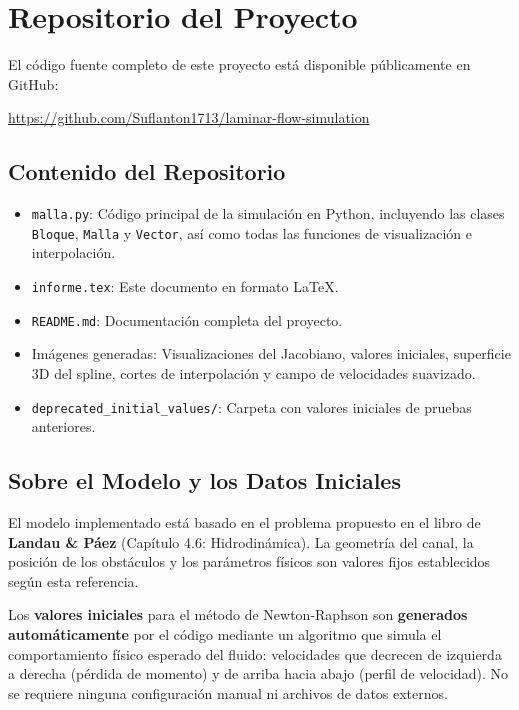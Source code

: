 \documentclass[11pt,letterpaper]{article}
\begin{document}
\section{Repositorio del Proyecto}

El código fuente completo de este proyecto está disponible públicamente en GitHub:

\begin{center}
\url{https://github.com/Suflanton1713/laminar-flow-simulation}
\end{center}

\subsection{Contenido del Repositorio}

\begin{itemize}
    \item \texttt{malla.py}: Código principal de la simulación en Python, incluyendo las clases \texttt{Bloque}, \texttt{Malla} y \texttt{Vector}, así como todas las funciones de visualización e interpolación.
    \item \texttt{informe.tex}: Este documento en formato \LaTeX.
    \item \texttt{README.md}: Documentación completa del proyecto.
    \item Imágenes generadas: Visualizaciones del Jacobiano, valores iniciales, superficie 3D del spline, cortes de interpolación y campo de velocidades suavizado.
    \item \texttt{deprecated\_initial\_values/}: Carpeta con valores iniciales de pruebas anteriores.
\end{itemize}

\subsection{Sobre el Modelo y los Datos Iniciales}

El modelo implementado está basado en el problema propuesto en el libro de \textbf{Landau \& Páez} \cite{LandauPaez} (Capítulo 4.6: Hidrodinámica). La geometría del canal, la posición de los obstáculos y los parámetros físicos son valores fijos establecidos según esta referencia.

Los \textbf{valores iniciales} para el método de Newton-Raphson son \textbf{generados automáticamente} por el código mediante un algoritmo que simula el comportamiento físico esperado del fluido: velocidades que decrecen de izquierda a derecha (pérdida de momento) y de arriba hacia abajo (perfil de velocidad). No se requiere ninguna configuración manual ni archivos de datos externos.
\end{document}
